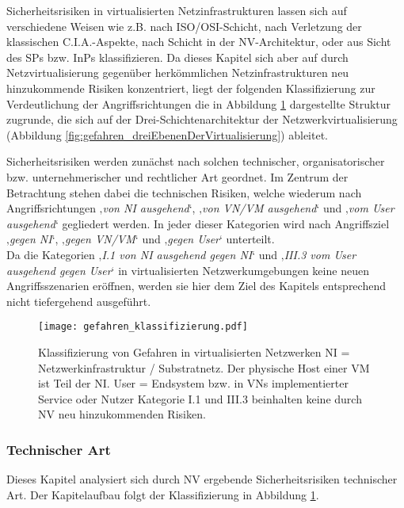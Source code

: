Sicherheitsrisiken in virtualisierten Netzinfrastrukturen lassen sich auf verschiedene Weisen wie z.B. nach ISO/OSI-Schicht, nach Verletzung der klassischen C.I.A.-Aspekte, nach Schicht in der NV-Architektur, oder aus Sicht des SPs bzw. InPs klassifizieren. Da dieses Kapitel sich aber auf durch Netzvirtualisierung gegenüber herkömmlichen Netzinfrastrukturen neu hinzukommende Risiken konzentriert, liegt der folgenden Klassifizierung zur Verdeutlichung der Angriffsrichtungen die in Abbildung \ref{fig:gefahren_klassifizierung} dargestellte Struktur zugrunde, die sich auf der Drei-Schichtenarchitektur der Netzwerkvirtualisierung (Abbildung \ref{fig:gefahren_dreiEbenenDerVirtualisierung}) ableitet.

Sicherheitsrisiken werden zunächst nach solchen technischer, organisatorischer bzw. unternehmerischer und rechtlicher Art geordnet. Im Zentrum der Betrachtung stehen dabei die technischen Risiken, welche wiederum nach Angriffsrichtungen ‚\textit{von NI ausgehend}‘, ‚\textit{von VN/VM ausgehend}‘ und ‚\textit{vom User ausgehend}‘ gegliedert werden. In jeder dieser Kategorien wird nach Angriffsziel ‚\textit{gegen NI}‘, ‚\textit{gegen VN/VM}‘ und ‚\textit{gegen User}‘ unterteilt. \\
Da die Kategorien ‚\textit{I.1 von NI ausgehend gegen NI}‘ und ‚\textit{III.3 vom User ausgehend gegen User}‘ in virtualisierten Netzwerkumgebungen keine neuen Angriffsszenarien eröffnen, werden sie hier dem Ziel des Kapitels entsprechend nicht tiefergehend ausgeführt. 


\begin{figure}[htb]
	\begin{center}
	\texttt{[image: gefahren\_klassifizierung.pdf]}
	\caption{\label{fig:gefahren_klassifizierung} Klassifizierung von Gefahren in virtualisierten Netzwerken
		\newline NI = Netzwerkinfrastruktur / Substratnetz. Der physische Host einer VM ist Teil der NI.
		\newline User = Endsystem bzw. in VNs implementierter Service oder Nutzer
		\newline Kategorie I.1 und III.3 beinhalten keine durch NV neu hinzukommenden Risiken.}
	\end{center}
\end{figure}





\subsubsection{Technischer Art}
\label{subsubsec:gefahren_virt_technisch}
Dieses Kapitel analysiert sich durch NV ergebende Sicherheitsrisiken technischer Art.
Der Kapitelaufbau folgt der Klassifizierung in Abbildung \ref{fig:gefahren_klassifizierung}. 


